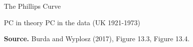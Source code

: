 \documentclass{beamer}
\begin{document}
\begin{frame}{The Phillips Curve}
\begin{center}
PC in theory \hspace{15mm} PC in the data (UK 1921-1973)
\begin{figure}[h!]
\end{figure}
\begin{minipage}{1.0\columnwidth}
\tiny	
\textbf{Source.} Burda and Wyplosz (2017), Figure 13.3, Figure 13.4.\\
\end{minipage}
\end{center}

\end{frame}
\end{document}
